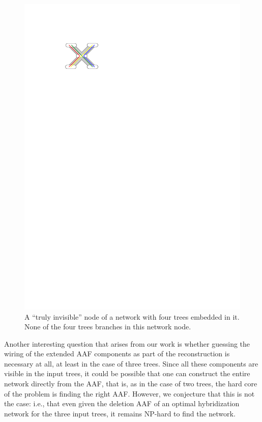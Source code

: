   \begin{figure}[h]
    \centering
    \includegraphics{../figs/ch4/braided}
    \caption{A ``truly invisible'' node of a network with four trees embedded in it. None of the four trees branches in this network node.}
    \label{fig:braided}
  \end{figure}


Another interesting question that arises from our work is whether guessing the wiring of the extended AAF components as part of the reconstruction is necessary at all, at least in the case of three trees. Since all these components are visible in the input trees, it could be possible that one can construct the entire network directly from the AAF, that is, as in the case of two trees, the hard core of the problem is finding the right AAF. However, we conjecture that this is not the case: i.e., that even given the deletion AAF of an optimal hybridization network for the three input trees, it remains NP-hard to find the network. 